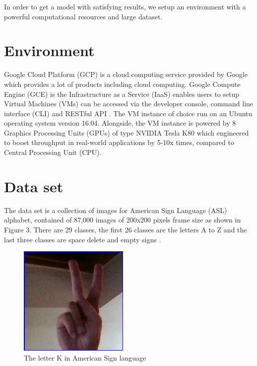 \documentclass[12pt]{report}
\begin{document}
\clearpage
In order to get a model with satisfying results, 
we setup an environment with a powerful computational 
resources and large dataset.

\section{Environment}
Google Cloud Platform (GCP) is a cloud computing service 
provided by Google which provides a lot of products including 
cloud computing.
Google Compute Engine (GCE) is the Infrastructure as a Service (IaaS) 
enables users to setup Virtual Machines (VMs)  can be accessed via 
the developer console, command line interface (CLI) and RESTful API \cite{google_cloud}.
The VM instance of choice  run on an Ubuntu operating system version 
16.04. Alongside, the VM instance is powered by 8 Graphics Processing Units 
(GPUs) of type NVIDIA Tesla K80  which engineered to boost throughput in 
real-world applications by 5-10x times, compared to Central Processing Unit (CPU).

\section{Data set}
The data set is a collection of images for American Sign Language (ASL) alphabet,
contained of 87,000 images of 200x200 pixels frame size as shown in Figure 3. 
There are 29 classes, the first 26 classes are the letters A to Z and the last
three classes are space delete and empty signs \cite{kaggle_dataset}.

\begin{figure}
    \centering
    \includegraphics[width=\textwidth]{./images/letter_k.jpg}
    \caption{The letter K in American Sign language}
    \label{fig:letter_k}
\end{figure}
\end{document}
